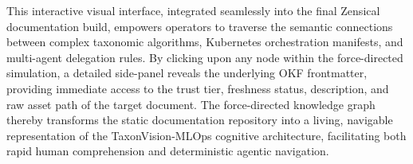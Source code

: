 This interactive visual interface, integrated seamlessly into the final Zensical documentation build, empowers operators to traverse the semantic connections between complex taxonomic algorithms, Kubernetes orchestration manifests, and multi-agent delegation rules. By clicking upon any node within the force-directed simulation, a detailed side-panel reveals the underlying OKF frontmatter, providing immediate access to the trust tier, freshness status, description, and raw asset path of the target document. The force-directed knowledge graph thereby transforms the static documentation repository into a living, navigable representation of the TaxonVision-MLOps cognitive architecture, facilitating both rapid human comprehension and deterministic agentic navigation.
